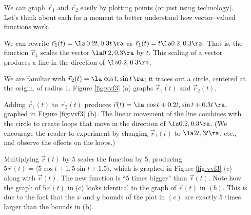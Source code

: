 {We can graph $\vec r_1$ and $\vec r_2$ easily by plotting points (or just using technology). Let's think about each for a moment to better understand how vector--valued functions work.

We can rewrite $\vec r_1(t) = \la\, 0.2t,0.3t\,\ra$ as $ \vec r_1(t) = t\la 0.2,0.3\ra$. That is, the function $\vec r_1$ scales the vector $\la 0.2,0.3\ra$ by $t$. This scaling of a vector produces a line in the direction of $\la 0.2,0.3\ra$. 

We are familiar with $\vec r_2(t) = \la\, \cos t,\sin t\,\ra$; it traces out a circle, centered at the origin, of radius 1. Figure \ref{fig:vvf3} (a) graphs $\vec r_1(t)$ and $\vec r_2(t)$.

Adding $\vec r_1(t)$ to $\vec r_2(t)$ produces $\vec r(t) = \la\,\cos t + 0.2t,\sin t+0.3t\,\ra$, graphed in Figure \ref{fig:vvf3} (b). The linear movement of the line combines with the circle to create loops that move in the direction of $\la 0.2,0.3\ra$.  (We encourage the reader to experiment by changing $\vec r_1(t)$ to $\la 2t,3t\ra$, etc., and observe the effects on the loops.)

Multiplying $\vec r(t)$ by 5 scales the function by 5, producing $5\vec r(t) =  \langle 5\cos t+1,5\sin t+1.5\rangle$, which is graphed in Figure \ref{fig:vvf3} (c) along with $\vec r(t)$. The new function is ``5 times bigger'' than $\vec r(t)$. Note how the graph of $5\vec r(t)$ in (c) looks identical to the graph of $\vec r(t)$ in $(b)$. This is due to the fact that the $x$ and $y$ bounds of the plot in $(c)$ are exactly 5 times larger than the bounds in (b).
}\\

